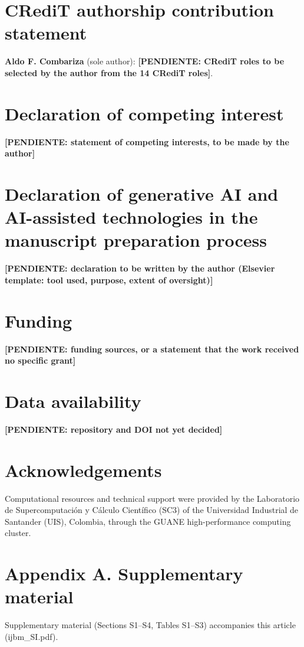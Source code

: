 \documentclass[preprint,12pt]{elsarticle}
\newcommand{\pend}[1]{\textbf{[PENDIENTE: #1]}}
\begin{document}
\section*{CRediT authorship contribution statement}
\textbf{Aldo F. Combariza} (sole author): \pend{CRediT roles to be selected by the author from
the 14 CRediT roles}.

\section*{Declaration of competing interest}
\pend{statement of competing interests, to be made by the author}

\section*{Declaration of generative AI and AI-assisted technologies in the manuscript preparation process}
\pend{declaration to be written by the author (Elsevier template: tool used, purpose, extent of
oversight)}

\section*{Funding}
\pend{funding sources, or a statement that the work received no specific grant}

\section*{Data availability}
\pend{repository and DOI not yet decided}

\section*{Acknowledgements}
Computational resources and technical support were provided by the Laboratorio de
Supercomputaci\'on y C\'alculo Cient\'ifico (SC3) of the Universidad Industrial de
Santander (UIS), Colombia, through the GUANE high-performance computing cluster.

\section*{Appendix A. Supplementary material}
Supplementary material (Sections S1--S4, Tables S1--S3) accompanies this article
(ijbm\_SI.pdf).



\end{document}
